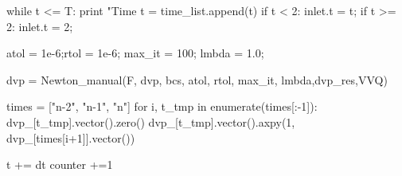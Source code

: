 \begin{python}

while t <= T:
    print "Time t = %
    time_list.append(t)
    if t < 2:
        inlet.t = t;
    if t >= 2:
        inlet.t = 2;

    atol = 1e-6;rtol = 1e-6; max_it = 100; lmbda = 1.0;

    dvp = Newton_manual(F, dvp, bcs, atol, rtol, max_it, lmbda,dvp_res,VVQ)


    times = ["n-2", "n-1", "n"]
    for i, t_tmp in enumerate(times[:-1]):
   	dvp_[t_tmp].vector().zero()
    	dvp_[t_tmp].vector().axpy(1, dvp_[times[i+1]].vector())

    t += dt
    counter +=1
\end{python}



	